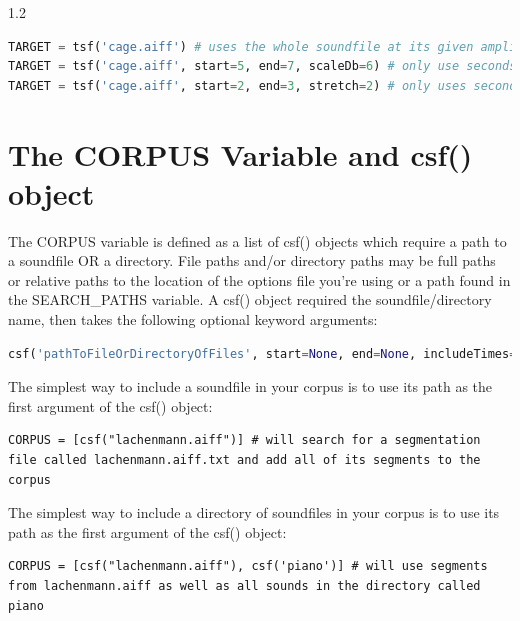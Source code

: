 \documentclass{article}
\begin{document}
\begin{spacing}{1.2}
\begin{lstlisting}[language=python]
TARGET = tsf('cage.aiff') # uses the whole soundfile at its given amplitude
TARGET = tsf('cage.aiff', start=5, end=7, scaleDb=6) # only use seconds 5-7 of cage.aiff at double the amplitude.
TARGET = tsf('cage.aiff', start=2, end=3, stretch=2) # only uses seconds 2-3, but stretches the sound with supervp to twice its duration before concatenation
\end{lstlisting}


\section{The CORPUS Variable and csf() object}
The CORPUS variable is defined as a list of csf() objects which require a path to a soundfile OR a directory.  File paths and/or directory paths may be full paths or relative paths to the location of the options file you're using or a path found in the SEARCH\_PATHS variable.  A csf() object required the soundfile/directory name, then takes the following optional keyword arguments:

\begin{lstlisting}[language=python]
csf('pathToFileOrDirectoryOfFiles', start=None, end=None, includeTimes=[], excludeTimes=[], limit=[], wholeFile=False, recursive=True, includeStr=None, excludeStr=None, scaleDb=0.0, limitDur=None, onsetLen=0.01, offsetLen='30%', postSelectAmpBool=False, postSelectAmpMethod='power-mean-seg', postSelectAmpMin=-12, postSelectAmpMax=+12, midiPitchMethod='composite', transMethod=None,  transQuantize=0, allowRepetition=True, restrictRepetition=0.5, restrictOverlaps=None, restrictInTime=0, maxPercentTargetSegments=None, scaleDistance=1, superimposeRule=None, segmentationFile=None, segmentationExtension='.txt')
\end{lstlisting}

The simplest way to include a soundfile in your corpus is to use its path as the first argument of the csf() object:
\begin{lstlisting}
CORPUS = [csf("lachenmann.aiff")] # will search for a segmentation file called lachenmann.aiff.txt and add all of its segments to the corpus
\end{lstlisting}

The simplest way to include a directory of soundfiles in your corpus is to use its path as the first argument of the csf() object:
\begin{lstlisting}
CORPUS = [csf("lachenmann.aiff"), csf('piano')] # will use segments from lachenmann.aiff as well as all sounds in the directory called piano
\end{lstlisting}


\end{spacing}
\end{document}
